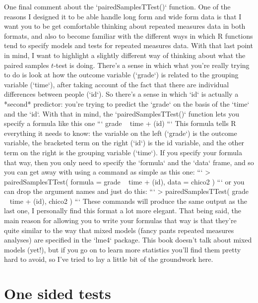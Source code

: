 One final comment about the `pairedSamplesTTest()` function. One of the reasons I designed it to be able handle long form and wide form data is that I want you to be get comfortable thinking about repeated measures data in both formats, and also to become familiar with the different ways in which R functions tend to specify models and tests for repeated measures data. With that last point in mind, I want to highlight a slightly different way of thinking about what the paired samples $t$-test is doing. There's a sense in which what you're really trying to do is look at how the outcome variable (`grade`) is related to the grouping variable (`time`), after taking account of the fact that there are individual differences between people (`id`). So there's a sense in which `id` is actually a *second* predictor: you're trying to predict the `grade` on the basis of the `time` and the `id`. With that in mind, the `pairedSamplesTTest()` function lets you specify a formula like this one
```
grade ~ time + (id)
```
This formula tells R everything it needs to know: the variable on the left (`grade`) is the outcome variable, the bracketed term on the right (`id`) is the id variable, and the other term on the right is the grouping variable (`time`). If you specify your formula that way, then you only need to specify the `formula` and the `data` frame, and so you can get away with using a command as simple as this one:
```
> pairedSamplesTTest( 
     formula = grade ~ time + (id),
     data = chico2
  )
```
or you can drop the argument names and just do this:
```
> pairedSamplesTTest( grade ~ time + (id), chico2 )
```
These commands will produce the same output as the last one, I personally find this format a lot more elegant. That being said, the main reason for allowing you to write your formulas that way is that they're quite similar to the way that mixed models (fancy pants repeated measures analyses) are specified in the `lme4` package. This book doesn't talk about mixed models (yet!), but if you go on to learn more statistics you'll find them pretty hard to avoid, so I've tried to lay a little bit of the groundwork here.


\section{One sided tests}

